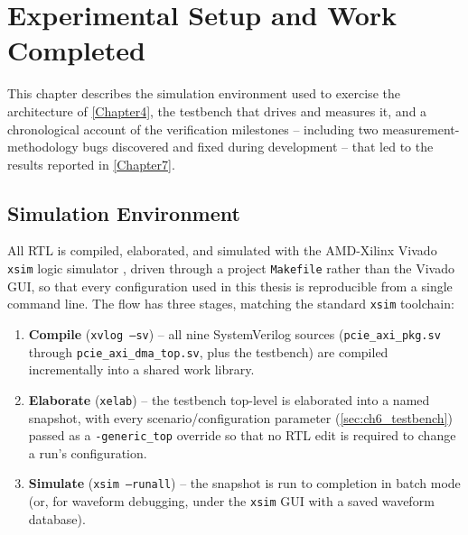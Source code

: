 
\chapter{Experimental Setup and Work Completed}

\label{Chapter6}


This chapter describes the simulation environment used to exercise the architecture of \autoref{Chapter4}, the testbench that drives and measures it, and a chronological account of the verification milestones -- including two measurement-methodology bugs discovered and fixed during development -- that led to the results reported in \autoref{Chapter7}.


\section{Simulation Environment}
\label{sec:ch6_simenv}

All RTL is compiled, elaborated, and simulated with the AMD-Xilinx Vivado \texttt{xsim} logic simulator \cite{xilinx2022vivadosim}, driven through a project \texttt{Makefile} rather than the Vivado GUI, so that every configuration used in this thesis is reproducible from a single command line. The flow has three stages, matching the standard \texttt{xsim} toolchain:

\begin{enumerate}
    \item \textbf{Compile} (\texttt{xvlog --sv}) -- all nine SystemVerilog sources (\texttt{pcie\_axi\_pkg.sv} through \texttt{pcie\_axi\_dma\_top.sv}, plus the testbench) are compiled incrementally into a shared work library.
    \item \textbf{Elaborate} (\texttt{xelab}) -- the testbench top-level is elaborated into a named snapshot, with every scenario/configuration parameter (\autoref{sec:ch6_testbench}) passed as a \texttt{-generic\_top} override so that no RTL edit is required to change a run's configuration.
    \item \textbf{Simulate} (\texttt{xsim ---runall}) -- the snapshot is run to completion in batch mode (or, for waveform debugging, under the \texttt{xsim} GUI with a saved waveform database).
    \end{enumerate}

